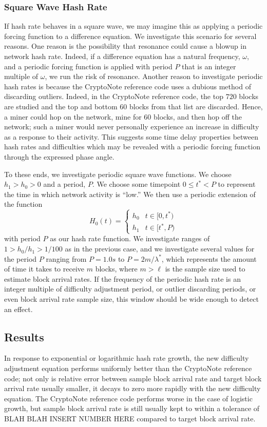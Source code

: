 \documentclass[12pt,english]{mrl}
\theoremstyle{definition}
\renewcommand{\leq}{\leqslant}
\numberwithin{equation}{section}
\numberwithin{figure}{section}
\numberwithin{equation}{section}
\numberwithin{equation}{section}
\numberwithin{figure}{section}
\begin{document}
\subsubsection{Square Wave Hash Rate}\label{squareWaveComp}

If hash rate behaves in a square wave, we may imagine this as applying a periodic forcing function to a difference equation. We investigate this scenario for several reasons. One reason is the possibility that resonance could cause a blowup in network hash rate. Indeed, if a difference equation has a natural frequency, $\omega$, and a periodic forcing function is applied with period $P$ that is an integer multiple of $\omega$, we run the risk of resonance.  Another reason to investigate periodic hash rates is because the CryptoNote reference code uses a dubious method of discarding outliers. Indeed, in the CryptoNote reference code, the top $720$ blocks are studied and the top and bottom $60$ blocks from that list are discarded. Hence, a miner could hop on the network, mine for $60$ blocks, and then hop off the network; such a miner would never personally experience an increase in difficulty as a response to their activity. This suggests some time delay properties between hash rates and difficulties which may be revealed with a periodic forcing function through the expressed phase angle.

To these ends, we investigate periodic square wave functions. We choose $h_1 > h_0 > 0$ and a period, $P$. We choose some timepoint $0 \leq t^{*} < P$ to represent the time in which network activity is ``low.'' We then use a periodic extension of the function
\[H_0(t) = \begin{cases} h_0 & t \in [0, t^*)\\
h_1 & t \in [t^*, P)\end{cases}\]
with period $P$ as our hash rate function. We investigate ranges of $1 > h_0/h_1 > 1/100$ as in the previous case, and we investigate several values for the period $P$ ranging from $P=1.0 s$ to $P=2m/\lambda^{*}$, which represents the amount of time it takes to receive $m$ blocks, where $m > \ell$ is the sample size used to estimate block arrival rates. If the frequency of the periodic hash rate is an integer multiple of difficulty adjustment period, or outlier discarding periods, or even block arrival rate sample size, this window should be wide enough to detect an effect.

\subsection{Results}
In response to exponential or logarithmic hash rate growth, the new difficulty adjustment equation performs uniformly better than the CryptoNote reference code; not only is relative error between sample block arrival rate and target block arrival rate usually smaller, it decays to zero more rapidly with the new difficulty equation. The CryptoNote reference code performs worse in the case of logistic growth, but sample block arrival rate is still usually kept to within a tolerance of BLAH BLAH INSERT NUMBER HERE compared to target block arrival rate.
\end{document}
